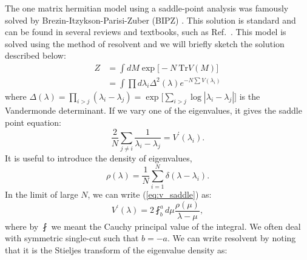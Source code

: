 \documentclass[11pt]{article}
\begin{document}
The one matrix hermitian model using a saddle-point analysis was famously solved by 
Brezin-Itzykson-Parisi-Zuber (BIPZ) \cite{Brezin:1977sv}. This solution is standard 
and can be found in several reviews and textbooks, such as Ref.~\cite{DiFrancesco:1993cyw, Marino:2004eq, 2002mcgt.book.....M}. 
This model is solved using the method of resolvent
and we will briefly sketch the solution described below:
\begin{align}
	Z &= \int dM \exp\Big[-N~\mbox{Tr} V(M)\Big] \\
	& = \int \prod d\lambda_{i} \Delta^2(\lambda)  e^{-N \sum V(\lambda_i)} 
\end{align}
where $\Delta(\lambda) = \prod_{i > j} (\lambda_i - \lambda_j) = \exp\Big[\sum_{i>j} \log |\lambda_{i} - \lambda_{j}|\Big]$ is the Vandermonde 
determinant. If we vary one of the eigenvalues, it gives the saddle point equation:
\begin{equation}
	\label{eq:v_saddle}
	\frac{2}{N} \sum_{j \neq i} \frac{1}{\lambda_i - \lambda_j} = V^{\prime}(\lambda_i).
\end{equation}
It is useful to introduce the density of eigenvalues,
\begin{equation}
	\rho(\lambda) = \frac{1}{N} \sum_{i=1}^{N} \delta(\lambda - \lambda_i). 
\end{equation}
In the limit of large $N$, we can write (\ref{eq:v_saddle})
as:
\begin{equation}
	\label{eq:vprime}
	V^{\prime}(\lambda) = 2 \fint_{b}^{a} d\mu \frac{\rho(\mu)}{\lambda - \mu}, 
\end{equation}
where by $\fint$ we meant the Cauchy principal value of the integral. We 
often deal with symmetric single-cut such that $b=-a$. 
We can write resolvent by noting that it is the Stieljes transform of the eigenvalue density as: 
\end{document}
